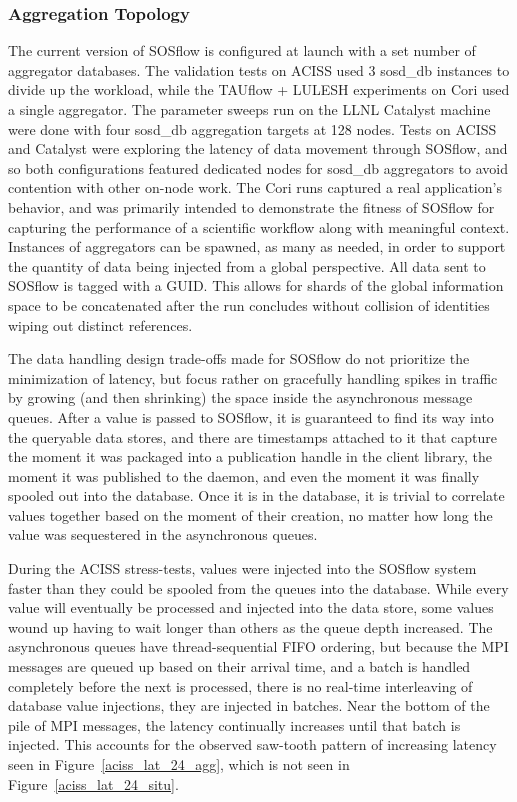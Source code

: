 \subsubsection{Aggregation Topology}
The current version of SOSflow is configured at launch with a set
number of aggregator databases.
%
The validation tests on ACISS used 3 sosd\_db instances to divide up
the workload, while the TAUflow + LULESH experiments on Cori used a
single aggregator.
%
The parameter sweeps run on the LLNL Catalyst machine were done with
four sosd\_db aggregation targets at 128 nodes.
%
Tests on ACISS and Catalyst were exploring the latency of data
movement through SOSflow, and so both configurations featured
dedicated nodes for sosd\_db aggregators to avoid contention
with other on-node work.
%
The Cori runs captured a real application's behavior, and was primarily
intended to demonstrate the fitness of SOSflow for capturing the
performance of a scientific workflow along with meaningful context.
%
Instances of aggregators can be spawned, as many as needed, in order
to support the quantity of data being injected from a global
perspective.
%
All data sent to SOSflow is tagged with a GUID.
%
This allows for shards of the global information space to be
concatenated after the run concludes without collision of identities
wiping out distinct references.
%
\par
%
The data handling design trade-offs made for SOSflow do not prioritize
the minimization of latency, but focus rather on gracefully
handling spikes in traffic by growing (and then shrinking) the space
inside the asynchronous message queues.
%
After a value is passed to SOSflow, it is guaranteed to find its
way into the queryable data stores, and there are timestamps attached
to it that capture the moment it was packaged into a publication handle in
the client library, the moment it was published to the daemon, and
even the moment it was finally spooled out into the database.
%
Once it is in the database, it is trivial to correlate values
together based on the moment of their creation, no matter
how long the value was sequestered in the asynchronous queues.
%
\par
%
During the ACISS stress-tests, values were injected into the
SOSflow system faster than they could be spooled from the queues into
the database.
%
While every value will eventually be processed and injected into the data
store, some values wound up having to wait longer than others as the queue
depth increased.
%
The asynchronous queues have thread-sequential FIFO ordering, but
because the MPI messages are queued up based on their arrival time,
and a batch is handled completely before the next is processed, there
is no real-time interleaving of database value injections, they are
injected in batches.
%
Near the bottom of the pile of MPI messages, the latency continually
increases until that batch is injected.
%
This accounts for the observed saw-tooth pattern of increasing latency
seen in Figure~\ref{aciss_lat_24_agg}, which is not seen in
Figure~\ref{aciss_lat_24_situ}.
%
%


